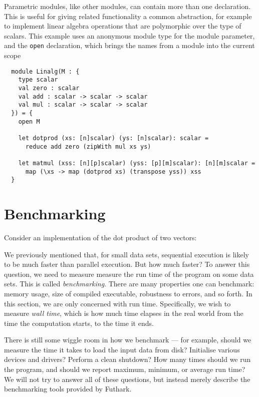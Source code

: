\documentclass[oneside,11pt]{book}
\begin{document}
Parametric modules, like other modules, can contain more than one
declaration.  This is useful for giving related functionality a common
abstraction, for example to implement linear algebra operations that
are polymorphic over the type of scalars.  This example uses an
anonymous module type for the module parameter, and the \texttt{open}
declaration, which brings the names from a module into the current
scope

\begin{lstlisting}
  module Linalg(M : {
    type scalar
    val zero : scalar
    val add : scalar -> scalar -> scalar
    val mul : scalar -> scalar -> scalar
  }) = {
    open M

    let dotprod (xs: [n]scalar) (ys: [n]scalar): scalar =
      reduce add zero (zipWith mul xs ys)

    let matmul (xss: [n][p]scalar) (yss: [p][m]scalar): [n][m]scalar =
      map (\xs -> map (dotprod xs) (transpose yss)) xss
  }
\end{lstlisting}

\section{Benchmarking}
\label{sec:benchmarking}

Consider an implementation of the dot product of two vectors:



We previously mentioned that, for small data sets, sequential
execution is likely to be much faster than parallel execution.  But
how much faster?  To answer this question, we need to measure measure
the run time of the program on some data sets.  This is called
\textit{benchmarking}.  There are many properties one can benchmark:
memory usage, size of compiled executable, robustness to errors, and
so forth.  In this section, we are only concerned with run time.
Specifically, we wish to measure \textit{wall time}, which is how much
time elapses in the real world from the time the computation starts,
to the time it ends.

There is still some wiggle room in how we benchmark --- for example,
should we measure the time it takes to load the input data from disk?
Initialise various devices and drivers?  Perform a clean shutdown?
How many times should we run the program, and should we report
maximum, minimum, or average run time?  We will not try to answer all
of these questions, but instead merely describe the benchmarking tools
provided by Futhark.
\end{document}
